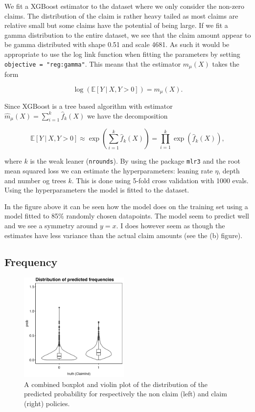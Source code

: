 \documentclass[
]{article}
\begin{document}
We fit a XGBoost estimator to the dataset where we only consider the
non-zero claims. The distribution of the claim is rather heavy tailed as
most claims are relative small but some claims have the potential of
being large. If we fit a gamma distribution to the entire dataset, we
see that the claim amount appear to be gamma distributed with shape 0.51
and scale 4681. As such it would be appropriate to use the log link
function when fitting the parameters by setting
\texttt{objective\ =\ "reg:gamma"}. This means that the estimator
\(m_\mu(X)\) takes the form

\[
\log(\mathbb E[Y\ \vert\ X,Y>0])=m_\mu(X).
\]

Since XGBoost is a tree based algorithm with estimator
\(\hat m_\mu(X) = \sum_{i=1}^k \hat f_k(X)\) we have the decomposition

\[
\mathbb E[Y\ \vert\ X,Y>0] \approx\exp\left(\sum_{i=1}^k \hat f_k(X)\right) =\prod_{i=1}^k\exp\left(\hat f_k(X)\right),
\]

where \(k\) is the weak leaner (\texttt{nrounds}). By using the package
\texttt{mlr3} and the root mean squared loss we can estimate the
hyperparameters: leaning rate \(\eta\), depth and number og trees \(k\).
This is done using 5-fold cross validation with 1000 evals. Using the
hyperparameters the model is fitted to the dataset.

In the figure above it can be seen how the model does on the training
set using a model fitted to 85\% randomly chosen datapoints. The model
seem to predict well and we see a symmetry around \(y=x\). I does
however seem as though the estimates have less variance than the actual
claim amounts (see the (b) figure).

\hypertarget{frequency}{%
\subsection{Frequency}\label{frequency}}

\begin{figure}
  \begin{center}
    \includegraphics[width=0.48\textwidth]{figures/freq_p1.png}
  \end{center}
  \caption{A combined boxplot and violin plot of the distribution of the predicted probability for respectively the non claim (left) and claim (right) policies.}
\end{figure}
\end{document}
